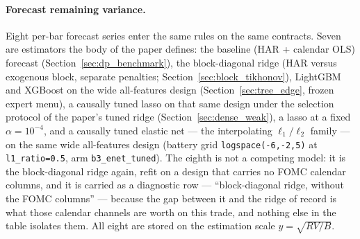\paragraph{Forecast remaining variance.} Eight per-bar forecast series
enter the same rules on the same contracts. Seven are estimators the body
of the paper defines: the baseline (HAR + calendar OLS) forecast
(Section~\ref{sec:dp_benchmark}), the block-diagonal ridge
(HAR versus exogenous block, separate penalties;
Section~\ref{sec:block_tikhonov}), LightGBM and XGBoost on the wide
all-features design (Section~\ref{sec:tree_edge}, frozen expert menu),
a causally tuned lasso on that same design under the selection
protocol of the paper's tuned ridge (Section~\ref{sec:dense_weak}), a
lasso at a fixed $\alpha = 10^{-4}$, and a causally tuned elastic net
--- the interpolating $\ell_1/\ell_2$ family --- on the same wide
all-features design (battery grid \texttt{logspace(-6,-2,5)} at
\texttt{l1\_ratio=0.5}, arm \texttt{b3\_enet\_tuned}). The eighth is not
a competing model: it is the block-diagonal ridge again, refit on a design
that carries no FOMC calendar columns, and it is carried as a diagnostic
row --- ``block-diagonal ridge, without the FOMC columns'' --- because the
gap between it and the ridge of record is what those calendar channels are
worth on this trade, and nothing else in the table isolates them. All eight
are stored on the estimation scale $y=\sqrt{RV/B}$.
